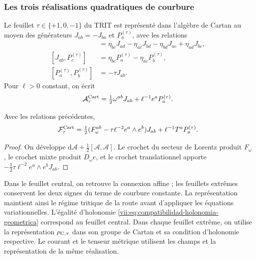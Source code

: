 \subsubsection{Les trois réalisations quadratiques de courbure}

Le feuillet \(\tau\in\{+1,0,-1\}\) du TRIT est représenté dans
l'algèbre de Cartan au moyen des générateurs \(J_{ab}=-J_{ba}\)
et \(P_a^{(\tau)}\), avec les relations
\begin{align*}
 [J_{ab},J_{cd}]&=
 \eta_{bc}J_{ad}-\eta_{ac}J_{bd}
 -\eta_{bd}J_{ac}+\eta_{ad}J_{bc},\\
 [J_{ab},P_c^{(\tau)}]&=
 \eta_{bc}P_a^{(\tau)}-\eta_{ac}P_b^{(\tau)},\\
 [P_a^{(\tau)},P_b^{(\tau)}]&=-\tau J_{ab}.
\end{align*}
Pour \(\ell>0\) constant, on écrit
\[
 \mathcal A_\tau^{\rm Cart}
 =\tfrac12\omega^{ab}J_{ab}+\ell^{-1}e^aP_a^{(\tau)}.
\]

\begin{proposition}
\label{vii:prop:curvatura-tritificada}
Avec les relations précédentes,
\begin{equation}
 \mathcal F_\tau^{\rm Cart}
 =\tfrac12(F_\omega^{ab}-\tau\ell^{-2}e^a\wedge e^b)J_{ab}
     +\ell^{-1}T^aP_a^{(\tau)}.
 \label{vii:eq:curvatura-tritificada}
\end{equation}
\end{proposition}
\begin{proof}
On développe \(\mathrm d\mathcal A+\tfrac12[\mathcal A,\mathcal A]\). Le crochet du secteur de Lorentz produit \(F_\omega\), le crochet mixte produit \(D_\omega e\), et le crochet translationnel apporte \(-\tfrac12\tau\ell^{-2}e^a\wedge e^bJ_{ab}\).
\end{proof}

Dans le feuillet central, on retrouve la connexion affine ; les feuillets extrêmes
conservent les deux signes du terme de courbure constante. La
représentation maintient ainsi le régime tritique de la route avant
d'appliquer les équations variationnelles. L'égalité d'holonomie
\eqref{vii:eq:compatibilidad-holonomia-geometrica} correspond au
feuillet central. Dans chaque feuillet extrême, on utilise la représentation
\(\rho_{{\rm C},\tau}\) dans son groupe de Cartan et sa condition
d'holonomie respective. Le courant et le tenseur métrique utilisent
les champs et la représentation de la même réalisation.
